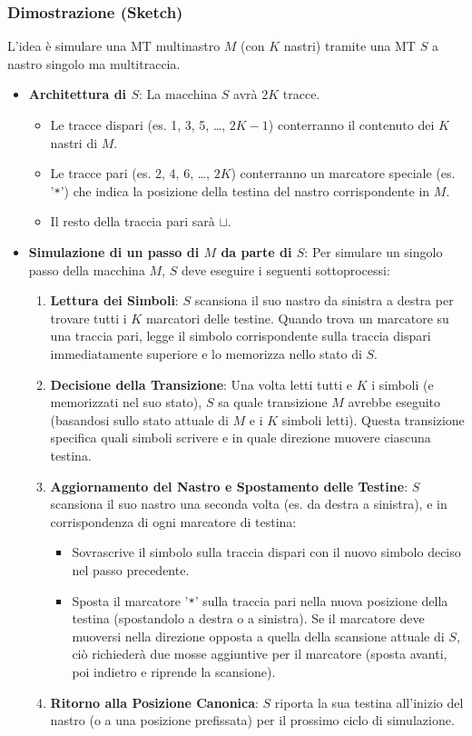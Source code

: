 \documentclass[a4paper, 11pt]{book} %
\theoremstyle{definition}
\begin{document}
\subsubsection{Dimostrazione (Sketch)}
L'idea è simulare una MT multinastro $M$ (con $K$ nastri) tramite una MT $S$ a nastro singolo ma multitraccia.
\begin{itemize}
    \item \textbf{Architettura di $S$}: La macchina $S$ avrà $2K$ tracce.
        \begin{itemize}
            \item Le tracce dispari (es. 1, 3, 5, \dots, $2K-1$) conterranno il contenuto dei $K$ nastri di $M$.
            \item Le tracce pari (es. 2, 4, 6, \dots, $2K$) conterranno un marcatore speciale (es. '\texttt{*}') che indica la posizione della testina del nastro corrispondente in $M$.
            \item Il resto della traccia pari sarà $\sqcup$.
        \end{itemize}
    \item \textbf{Simulazione di un passo di $M$ da parte di $S$}: Per simulare un singolo passo della macchina $M$, $S$ deve eseguire i seguenti sottoprocessi:
        \begin{enumerate}
            \item \textbf{Lettura dei Simboli}: $S$ scansiona il suo nastro da sinistra a destra per trovare tutti i $K$ marcatori delle testine. Quando trova un marcatore su una traccia pari, legge il simbolo corrispondente sulla traccia dispari immediatamente superiore e lo memorizza nello stato di $S$.
            \item \textbf{Decisione della Transizione}: Una volta letti tutti e $K$ i simboli (e memorizzati nel suo stato), $S$ sa quale transizione $M$ avrebbe eseguito (basandosi sullo stato attuale di $M$ e i $K$ simboli letti). Questa transizione specifica quali simboli scrivere e in quale direzione muovere ciascuna testina.
            \item \textbf{Aggiornamento del Nastro e Spostamento delle Testine}: $S$ scansiona il suo nastro una seconda volta (es. da destra a sinistra), e in corrispondenza di ogni marcatore di testina:
                \begin{itemize}
                    \item Sovrascrive il simbolo sulla traccia dispari con il nuovo simbolo deciso nel passo precedente.
                    \item Sposta il marcatore '\texttt{*}' sulla traccia pari nella nuova posizione della testina (spostandolo a destra o a sinistra). Se il marcatore deve muoversi nella direzione opposta a quella della scansione attuale di $S$, ciò richiederà due mosse aggiuntive per il marcatore (sposta avanti, poi indietro e riprende la scansione).
                \end{itemize}
            \item \textbf{Ritorno alla Posizione Canonica}: $S$ riporta la sua testina all'inizio del nastro (o a una posizione prefissata) per il prossimo ciclo di simulazione.
        \end{enumerate}
\end{itemize}
\end{document}
